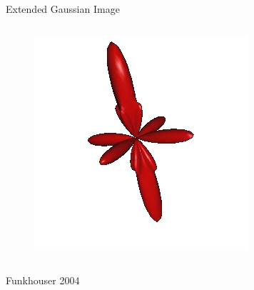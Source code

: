 \documentclass{beamer}
\begin{document}
\begin{frame}{Extended Gaussian Image}
\begin{columns}[c]
\begin{figure}[t]
    \includegraphics[width=\textwidth]{EGITable.png}
\end{figure}

\end{columns}



\begin{itemize}[label=$\vartriangleright$]


\end{itemize}

\small Funkhouser 2004

\end{frame}
\end{document}
